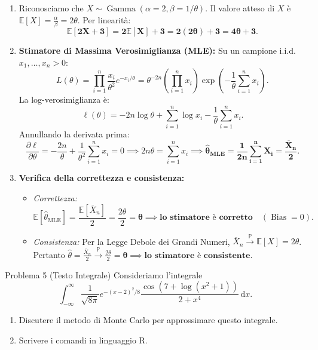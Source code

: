 \documentclass[11pt,a4paper]{article}
\newcommand{\EE}{\mathbb{E}}
\newcommand{\Prob}{\mathbb{P}}
\newcommand{\dx}{\mathrm{d}x}
\begin{document}
\begin{soluzionebox}
\begin{enumerate}[label=(\alph*)]
    \item Riconosciamo che $X \sim \operatorname{Gamma}(\alpha = 2, \beta = 1/\theta)$.
    Il valore atteso di $X$ è $\EE[X] = \frac{\alpha}{\beta} = 2\theta$.
    Per linearità:
    \[
    \mathbf{\EE[2X+3] = 2\EE[X] + 3 = 2(2\theta) + 3 = 4\theta + 3}.
    \]

    \item \textbf{Stimatore di Massima Verosimiglianza (MLE):}
    Su un campione i.i.d. $x_1, \dots, x_n > 0$:
    \[
    L(\theta) = \prod_{i=1}^n \frac{x_i}{\theta^2} e^{-x_i/\theta} = \theta^{-2n} \left(\prod_{i=1}^n x_i\right) \exp\left(-\frac{1}{\theta}\sum_{i=1}^n x_i\right).
    \]
    La log-verosimiglianza è:
    \[
    \ell(\theta) = -2n \log \theta + \sum_{i=1}^n \log x_i - \frac{1}{\theta}\sum_{i=1}^n x_i.
    \]
    Annullando la derivata prima:
    \[
    \frac{\partial \ell}{\partial \theta} = -\frac{2n}{\theta} + \frac{1}{\theta^2}\sum_{i=1}^n x_i = 0 \implies 2n\theta = \sum_{i=1}^n x_i \implies \mathbf{\widehat{\theta}_{\text{MLE}} = \frac{1}{2n}\sum_{i=1}^n X_i = \frac{\overline{X}_n}{2}}.
    \]

    \item \textbf{Verifica della correttezza e consistenza:}
    \begin{itemize}
        \item \emph{Correttezza:}
        \[
        \EE[\widehat{\theta}_{\text{MLE}}] = \frac{\EE[\overline{X}_n]}{2} = \frac{2\theta}{2} = \mathbf{\theta} \implies \textbf{lo stimatore è corretto} \quad (\operatorname{Bias} = 0).
        \]
        \item \emph{Consistenza:}
        Per la Legge Debole dei Grandi Numeri, $\overline{X}_n \xrightarrow{\Prob} \EE[X] = 2\theta$.
        Pertanto $\widehat{\theta} = \frac{\overline{X}_n}{2} \xrightarrow{\Prob} \frac{2\theta}{2} = \mathbf{\theta} \implies \textbf{lo stimatore è consistente}$.
    \end{itemize}
\end{enumerate}
\end{soluzionebox}

\begin{problemabox}{Problema 5 (Testo Integrale)}
Consideriamo l'integrale
\[
\int_{-\infty}^\infty \frac{1}{\sqrt{8\pi}} e^{-(x-2)^2/8} \frac{\cos(7 + \log(x^2 + 1))}{2 + x^4} \, \dx.
\]
\begin{enumerate}[label=(\alph*)]
    \item Discutere il metodo di Monte Carlo per approssimare questo integrale.
    \item Scrivere i comandi in linguaggio R.
\end{enumerate}
\end{problemabox}
\end{document}
